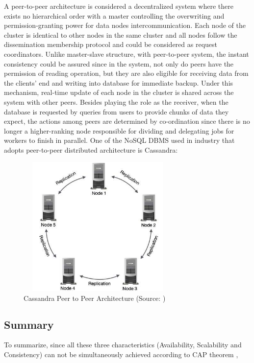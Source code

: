 \noindent A peer-to-peer architecture is considered a decentralized system where there exists no hierarchical order with a master controlling the overwriting and permission-granting power for data nodes intercommunication. Each node of the cluster is identical to other nodes in the same cluster and all nodes follow the dissemination membership protocol \cite{DBLP:journals/corr/abs-1712-04344} and could be considered as request coordinators. Unlike master-slave structure, with peer-to-peer system, the instant consistency could be assured since in the system, not only do peers have the permission of reading operation, but they are also eligible for receiving data from the clients' end and writing into database for immediate backup. Under this mechanism, real-time update of each node in the cluster is shared across the system with other peers. Besides playing the role as the receiver, when the database is requested by queries from users to provide chunks of data they expect, the actions among peers are determined by co-ordination since there is no longer a higher-ranking node responsible for dividing and delegating jobs for workers to finish in parallel. One of the NoSQL DBMS used in industry that adopts peer-to-peer distributed
architecture is Cassandra:

\begin{figure}[H]
	\includegraphics[height=7cm, width=8cm]{../../../images/casa.png}
	\caption{Cassandra Peer to Peer Architecture (Source: \cite{DBLP:journals/corr/abs-1712-04344})}
\end{figure}




\subsection{Summary}
To summarize, since all these three characteristics (Availability, Scalability and Consistency) can not be simultaneously achieved according to CAP theorem \cite{Brewer2012CAPTY}, 

